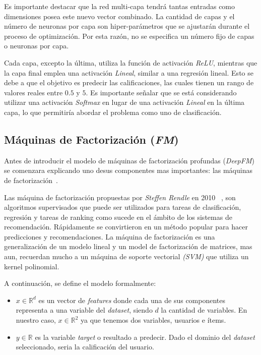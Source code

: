\documentclass[11pt,a4paper,twoside]{thesis}
\begin{document}
Es importante destacar que la red multi-capa tendrá tantas entradas como
dimensiones posea este nuevo vector combinado. La cantidad de capas y el número
de neuronas por capa son hiper-parámetros que se ajustarán durante el proceso
de optimización. Por esta razón, no se especifica un número fijo de capas o
neuronas por capa.

Cada capa, excepto la última, utiliza la función de activación \textit{ReLU},
mientras que la capa final emplea una activación \textit{Lineal}, similar a una
regresión lineal. Esto se debe a que el objetivo es predecir las
calificaciones, las cuales tienen un rango de valores reales entre $0.5$ y $5$.
Es importante señalar que se está considerando utilizar una activación
\textit{Softmax} en lugar de una activación \textit{Lineal} en la última capa,
lo que permitiría abordar el problema como uno de clasificación.

\clearpage

\subsection{Máquinas de Factorización (\textit{FM})}

Antes de introducir el modelo de máquinas de factorización profundas
(\textit{DeepFM}) se comenzara explicando uno desus componentes mas
importantes: las máquinas de factorización~\cite{didlfm, zhangdive}.

Las máquina de factorización propuestas por \textit{Steffen Rendle} en 2010
~\cite{fm}, son algoritmos supervisados que puede ser utilizados para tareas de
clasificación, regresión y tareas de ranking como sucede en el ámbito de los
sistemas de recomendación. Rápidamente se convirtieron en un método popular
para hacer predicciones y recomendaciones. La máquina de factorización es una
generalización de un modelo lineal y un model de factorización de matrices, mas
aun, recuerdan mucho a un máquina de soporte vectorial \textit{(SVM)} que
utiliza un kernel polinomial.

A continuación, se define el modelo formalmente:

\begin{itemize}
	\item $x\in\mathbb{R}^{d}$ es un vector de \textit{features} donde cada una de
	      sus componentes representa a una variable del \textit{dataset}, siendo $d$
	      la cantidad de variables. En nuestro caso,
	      $x\in\mathbb{R}^{2}$ ya que tenemos dos variables, usuarios e ítems.
	\item $y\in\mathbb{R}$ es la variable \textit{target} o resultado a predecir.
	      Dado el dominio del \textit{dataset} seleccionado, seria la
	      calificación del usuario.
\end{itemize}
\end{document}
